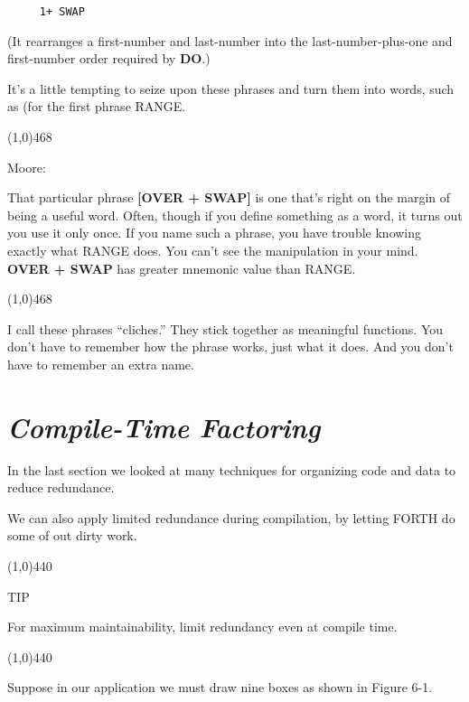 \documentclass{book}
\begin{document}
\begin{verbatim}
     1+ SWAP
\end{verbatim}

\noindent
(It rearranges a first-number and last-number into the last-number-plus-one and first-number order required by \textbf{DO}.)

It's a little tempting to seize upon these phrases and turn them into words, such as (for the first phrase RANGE.

\noindent
\line(1,0){468} 

\noindent
Moore:

\begin{list}{}{}

\item
That particular phrase \textbf{[OVER + SWAP]} is one that's right on the margin of being a useful word. Often, though if you define something as a word, it turns out you use it only once. If you name such a phrase, you have trouble knowing exactly what RANGE does. You can't see the manipulation in your mind. \textbf{OVER + SWAP} has greater mnemonic value than RANGE.

\end{list}{}{}

\noindent
\line(1,0){468}

\bigskip

\noindent
I call these phrases ``cliches.'' They stick together as meaningful functions. You don't have to remember how the phrase works, just what it does. And you don't have to remember an extra name.

\section*{
	\textit{Compile-Time Factoring}}

\noindent
In the last section we looked at many techniques for organizing code and data to reduce redundance.

We can also apply limited redundance during compilation, by letting FORTH do some of out dirty work.

\line(1,0){440} 

TIP 

For maximum maintainability, limit redundancy even at compile time.

\line(1,0){440}

\noindent
Suppose in our application we must draw nine boxes as shown in Figure 6-1.
\end{document}

